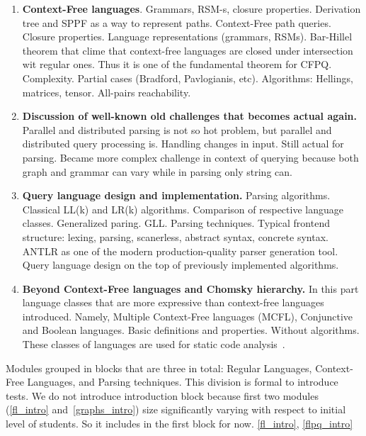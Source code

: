 \documentclass[sigconf]{acmart}
\begin{document}
\begin{enumerate}
  \item \label{cf_languages_intro} \textbf{Context-Free languages}. Grammars, RSM-s, closure properties. Derivation tree and SPPF as a way to represent paths. Context-Free path queries. 
  Closure properties. 
  Language representations (grammars, RSMs). 
  Bar-Hillel theorem that clime that context-free languages are closed under intersection wit regular ones.
  Thus it is one of the fundamental theorem for CFPQ.
  Complexity. 
  Partial cases (Bradford, Pavlogianis, etc).
  Algorithms: Hellings, matrices, tensor. All-pairs reachability.
  
  \item \label{new_old_problems_discussion} \textbf{Discussion of well-known old challenges that becomes actual again.} 
  Parallel and distributed parsing is not so hot problem, but parallel and distributed query processing is. 
  Handling changes in input. 
  Still actual for parsing. 
  Became more complex challenge in context of querying because both graph and grammar can vary while in parsing only string can. 
  
  \item \label{parsing_techniques} \textbf{Query language design and implementation.}
  Parsing algorithms. Classical LL(k) and LR(k) algorithms. Comparison of respective language classes. Generalized paring. GLL.
  Parsing techniques. 
  Typical frontend structure: lexing, parsing, scanerless, abstract syntax, concrete syntax.
  ANTLR as one of the modern production-quality parser generation tool.
  Query language design on the top of previously implemented algorithms. 
    
  \item \label{beyond_chomsky_hierarchy} \textbf{Beyond Context-Free languages and Chomsky hierarchy.}
  In this part language classes that are more expressive than context-free languages introduced. 
  Namely, Multiple Context-Free languages (MCFL), Conjunctive and Boolean languages. 
  Basic definitions and properties. Without algorithms. 
  These classes of languages are used for static code analysis~\cite{10.1145/3009837.3009848, 10.1145/3704854}.

\end{enumerate}

Modules grouped in blocks that are three in total: Regular Languages, Context-Free Languages, and Parsing techniques.
This division is formal to introduce tests.
We do not introduce introduction block because first two modules (\ref{fl_intro} and~\ref{graphs_intro}) size significantly varying with respect to initial level of students.
So it includes in the first block for now. \ref{fl_intro}, \ref{flpq_intro}
\end{document}
